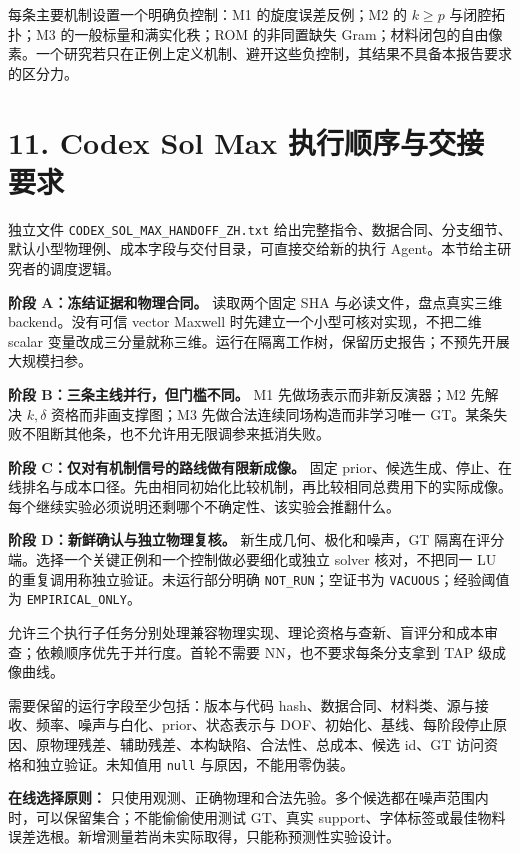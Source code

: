 \documentclass[11pt,a4paper]{article}
\begin{document}
每条主要机制设置一个明确负控制：M1 的旋度误差反例；M2 的 \(k\ge p\)
与闭腔拓扑；M3 的一般标量和满实化秩；ROM 的非同置缺失
Gram；材料闭包的自由像素。一个研究若只在正例上定义机制、避开这些负控制，其结果不具备本报告要求的区分力。

\hypertarget{codex-sol-max-ux6267ux884cux987aux5e8fux4e0eux4ea4ux63a5ux8981ux6c42}{%
\section{11. Codex Sol Max
执行顺序与交接要求}\label{codex-sol-max-ux6267ux884cux987aux5e8fux4e0eux4ea4ux63a5ux8981ux6c42}}

独立文件 \texttt{CODEX\_SOL\_MAX\_HANDOFF\_ZH.txt}
给出完整指令、数据合同、分支细节、默认小型物理例、成本字段与交付目录，可直接交给新的执行
Agent。本节给主研究者的调度逻辑。

\textbf{阶段 A：冻结证据和物理合同。} 读取两个固定 SHA
与必读文件，盘点真实三维 backend。没有可信 vector Maxwell
时先建立一个小型可核对实现，不把二维 scalar
变量改成三分量就称三维。运行在隔离工作树，保留历史报告；不预先开展大规模扫参。

\textbf{阶段 B：三条主线并行，但门槛不同。} M1
先做场表示而非新反演器；M2 先解决 \(k,\delta\) 资格而非画支撑图；M3
先做合法连续同场构造而非学习唯一
GT。某条失败不阻断其他条，也不允许用无限调参来抵消失败。

\textbf{阶段 C：仅对有机制信号的路线做有限新成像。} 固定
prior、候选生成、停止、在线排名与成本口径。先由相同初始化比较机制，再比较相同总费用下的实际成像。每个继续实验必须说明还剩哪个不确定性、该实验会推翻什么。

\textbf{阶段 D：新鲜确认与独立物理复核。} 新生成几何、极化和噪声，GT
隔离在评分端。选择一个关键正例和一个控制做必要细化或独立 solver
核对，不把同一 LU 的重复调用称独立验证。未运行部分明确
\texttt{NOT\_RUN}；空证书为 \texttt{VACUOUS}；经验阈值为
\texttt{EMPIRICAL\_ONLY}。

允许三个执行子任务分别处理兼容物理实现、理论资格与查新、盲评分和成本审查；依赖顺序优先于并行度。首轮不需要
NN，也不要求每条分支拿到 TAP 级成像曲线。

需要保留的运行字段至少包括：版本与代码
hash、数据合同、材料类、源与接收、频率、噪声与白化、prior、状态表示与
DOF、初始化、基线、每阶段停止原因、原物理残差、辅助残差、本构缺陷、合法性、总成本、候选
id、GT 访问资格和独立验证。未知值用 \texttt{null} 与原因，不能用零伪装。

\textbf{在线选择原则：}
只使用观测、正确物理和合法先验。多个候选都在噪声范围内时，可以保留集合；不能偷偷使用测试
GT、真实
support、字体标签或最佳物料误差选根。新增测量若尚未实际取得，只能称预测性实验设计。
\end{document}
